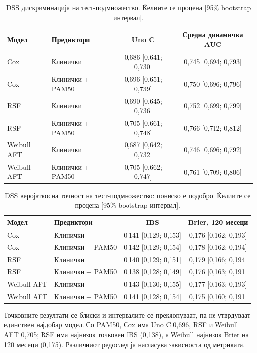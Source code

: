 \documentclass[12pt]{article}
\begin{document}
\begin{table}[ht]
\centering
\caption{DSS дискриминација на тест-подмножество. Ќелиите се процена [95\% bootstrap интервал].}
\label{tab:dss-performance}
\small
\begin{tabular}{llcc}
\hline
Модел & Предиктори & Uno C & Средна динамичка AUC \\
\hline
Cox & Клинички & 0,686 [0,641; 0,730] & 0,745 [0,694; 0,793] \\
Cox & Клинички + PAM50 & 0,696 [0,651; 0,739] & 0,750 [0,696; 0,796] \\
RSF & Клинички & 0,690 [0,645; 0,736] & 0,752 [0,699; 0,799] \\
RSF & Клинички + PAM50 & 0,705 [0,661; 0,748] & 0,766 [0,712; 0,812] \\
Weibull AFT & Клинички & 0,687 [0,642; 0,732] & 0,746 [0,696; 0,792] \\
Weibull AFT & Клинички + PAM50 & 0,705 [0,662; 0,747] & 0,761 [0,709; 0,806] \\
\hline
\end{tabular}
\end{table}
\begin{table}[ht]
\centering
\caption{DSS веројатносна точност на тест-подмножество: пониско е подобро. Ќелиите се процена [95\% bootstrap интервал].}
\label{tab:dss-performance-prob}
\small
\begin{tabular}{llcc}
\hline
Модел & Предиктори & IBS & Brier, 120 месеци \\
\hline
Cox & Клинички & 0,141 [0,129; 0,153] & 0,176 [0,162; 0,193] \\
Cox & Клинички + PAM50 & 0,142 [0,129; 0,154] & 0,178 [0,162; 0,194] \\
RSF & Клинички & 0,140 [0,129; 0,151] & 0,179 [0,166; 0,194] \\
RSF & Клинички + PAM50 & 0,138 [0,128; 0,149] & 0,176 [0,163; 0,191] \\
Weibull AFT & Клинички & 0,143 [0,130; 0,155] & 0,177 [0,163; 0,193] \\
Weibull AFT & Клинички + PAM50 & 0,141 [0,128; 0,154] & 0,175 [0,160; 0,191] \\
\hline
\end{tabular}
\end{table}
Точковните резултати се блиски и интервалите се преклопуваат, па не утврдуваат
единствен најдобар модел. Со PAM50, Cox има Uno C 0,696, RSF и Weibull AFT 0,705;
RSF има најнизок точковен IBS (0,138), а Weibull најнизок Brier на 120 месеци
(0,175). Различниот редослед ја нагласува зависноста од метриката.
\end{document}
